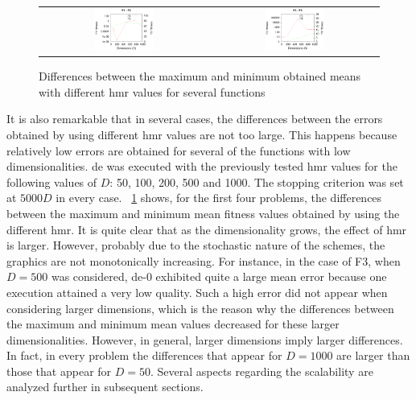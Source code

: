\documentclass[preprint,3p]{elsarticle}
\newcommand{\DE}{{\sc de}}
\newcommand{\HMR}{{\sc hmr}}
\begin{document}
\begin{figure}[!t]
\centering
\begin{tabular}{cc}
  \includegraphics[width=0.36\textwidth]{images/DifGrow/F1_F2_DifGrow.eps} & \includegraphics[width=0.36\textwidth]{images/DifGrow/F3_F4_DifGrow.eps}
\end{tabular}
\caption{Differences between the maximum and minimum obtained means with different \HMR{} values for several functions}
\label{fig:hmr_dimensions}
\end{figure}


It is also remarkable that in several cases, the differences between the errors obtained by using different \HMR{} values are not too large.
%
This happens because relatively low errors are obtained for several of the functions with low dimensionalities.
%
\DE{} was executed with the previously tested \HMR{} values for the following values of $D$: 50, 100, 200, 500 and 1000.
%
The stopping criterion was set at $5000D$ in every case.
%
\figurename~\ref{fig:hmr_dimensions} shows, for the first four problems, the differences between the maximum and minimum mean fitness values
obtained by using the different \HMR{}.
%
It is quite clear that as the dimensionality grows, the effect of \HMR{} is larger.
%
However, probably due to the stochastic nature of the schemes, the graphics are not monotonically increasing.
%
For instance, in the case of F3, when $D = 500$ was considered, \DE{}-0 exhibited quite a large mean error because
one execution attained a very low quality.
%
Such a high error did not appear when considering larger dimensions, which is the reason why the differences between the
maximum and minimum mean values decreased for these larger dimensionalities.
%
However, in general, larger dimensions imply larger differences.
%
In fact, in every problem the differences that appear for $D = 1000$ are larger
than those that appear for $D = 50$.
%
Several aspects regarding the scalability are analyzed further in subsequent sections.
\end{document}
